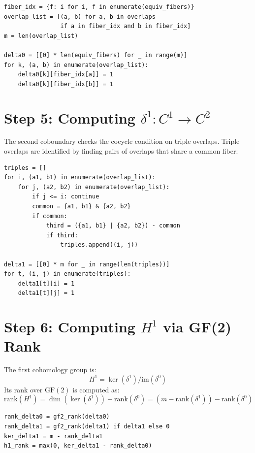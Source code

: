 \documentclass[11pt,a4paper]{report}
\theoremstyle{definition}
\theoremstyle{plain}
\newcommand{\Hone}{H^1}
\begin{document}
\begin{lstlisting}[caption={$\delta^0$ matrix construction
  (from \texttt{cohomology.py})}]
fiber_idx = {f: i for i, f in enumerate(equiv_fibers)}
overlap_list = [(a, b) for a, b in overlaps
                if a in fiber_idx and b in fiber_idx]
m = len(overlap_list)

delta0 = [[0] * len(equiv_fibers) for _ in range(m)]
for k, (a, b) in enumerate(overlap_list):
    delta0[k][fiber_idx[a]] = 1
    delta0[k][fiber_idx[b]] = 1
\end{lstlisting}

\section{Step 5: Computing $\delta^1 : C^1 \to C^2$}

The second coboundary checks the cocycle condition on triple overlaps.
Triple overlaps are identified by finding pairs of overlaps that share
a common fiber:

\begin{lstlisting}[caption={Triple overlap detection and $\delta^1$
  construction}]
triples = []
for i, (a1, b1) in enumerate(overlap_list):
    for j, (a2, b2) in enumerate(overlap_list):
        if j <= i: continue
        common = {a1, b1} & {a2, b2}
        if common:
            third = ({a1, b1} | {a2, b2}) - common
            if third:
                triples.append((i, j))

delta1 = [[0] * m for _ in range(len(triples))]
for t, (i, j) in enumerate(triples):
    delta1[t][i] = 1
    delta1[t][j] = 1
\end{lstlisting}

\section{Step 6: Computing $\Hone$ via GF(2) Rank}

The first cohomology group is:
\[
  \Hone = \ker(\delta^1) / \mathrm{im}(\delta^0)
\]
Its rank over $\mathrm{GF}(2)$ is computed as:
\[
  \mathrm{rank}(\Hone) = \dim(\ker(\delta^1)) -
    \mathrm{rank}(\delta^0) =
    (m - \mathrm{rank}(\delta^1)) - \mathrm{rank}(\delta^0)
\]

\begin{lstlisting}[caption={$\Hone$ rank computation
  (from \texttt{cohomology.py})}]
rank_delta0 = gf2_rank(delta0)
rank_delta1 = gf2_rank(delta1) if delta1 else 0
ker_delta1 = m - rank_delta1
h1_rank = max(0, ker_delta1 - rank_delta0)
\end{lstlisting}
\end{document}
